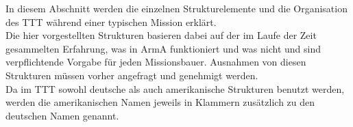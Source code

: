 In diesem Abschnitt werden die einzelnen Strukturelemente und die Organisation des \ac{TTT} während einer typischen Mission erklärt.\\
Die hier vorgestellten Strukturen basieren dabei auf der im Laufe der Zeit gesammelten Erfahrung, was in ArmA funktioniert und was nicht und sind verpflichtende Vorgabe für jeden Missionsbauer. Ausnahmen von diesen Strukturen müssen vorher angefragt und genehmigt werden.\\
Da im \ac{TTT} sowohl deutsche als auch amerikanische Strukturen benutzt werden, werden die amerikanischen Namen jeweils in Klammern zusätzlich zu den deutschen Namen genannt.











